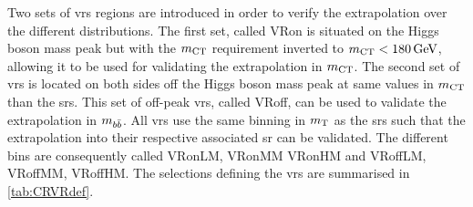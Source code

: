 Two sets of \glspl{vr} regions are introduced in order to verify the extrapolation over the different distributions. The first set, called VRon is situated on the Higgs boson mass peak but with the $m_{\textrm{CT}}$ requirement inverted to $\mct<\SI{180}{\GeV}$, allowing it to be used for validating the extrapolation in $m_{\textrm{CT}}$. The second set of \glspl{vr} is located on both sides off the Higgs boson mass peak at same values in $m_{\textrm{CT}}$ than the \glspl{sr}. This set of off-peak \glspl{vr}, called VRoff, can be used to validate the extrapolation in $m_{b\bar{b}}$. All \glspl{vr} use the same binning in $m_{\textrm{T}}$ as the \glspl{sr} such that the extrapolation into their respective associated \gls{sr} can be validated. The different bins are consequently called VRonLM, VRonMM VRonHM and VRoffLM, VRoffMM, VRoffHM. The selections defining the \glspl{vr} are summarised in \cref{tab:CRVRdef}.


